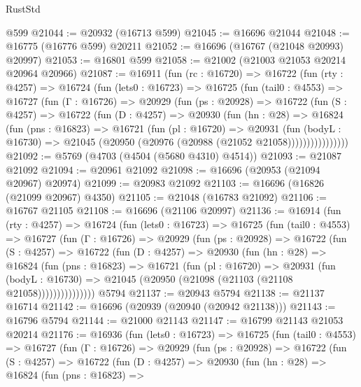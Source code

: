 \begin{lexlean}{RustStd}
\begin{coremodule}
    @599
@21044 := @20932 (@16713 @599)
@21045 := @16696 @21044
@21048 := @16775 (@16776 @599) @20211
@21052 := @16696 (@16767 (@21048 @20993) @20997)
@21053 := @16801 @599
@21058 := @21002 (@21003 @21053 @20214 @20964 @20966)
@21087 := @16911
    (fun (rc : @16720) =>
    @16722
      (fun (rty : @4257) =>
      @16724
        (fun (lets0 : @16723) =>
        @16725
          (fun (tail0 : @4553) =>
          @16727
            (fun (Γ : @16726) =>
            @20929
              (fun (ps : @20928) =>
              @16722
                (fun (S : @4257) =>
                @16722
                  (fun (D : @4257) =>
                  @20930
                    (fun (hn : @28) =>
                    @16824
                      (fun (pns : @16823) =>
                      @16721
                        (fun (pl : @16720) =>
                        @20931
                          (fun (bodyL : @16730) =>
                          @21045 (@20950 (@20976 (@20988 (@21052 @21058))))))))))))))))
@21092 := @5769 (@4703 (@4504 (@5680 @4310) @4514))
@21093 := @21087 @21092
@21094 := @20961 @21092
@21098 := @16696 (@20953 (@21094 @20967) @20974)
@21099 := @20983 @21092
@21103 := @16696 (@16826 (@21099 @20967) @4350)
@21105 := @21048 (@16783 @21092)
@21106 := @16767 @21105
@21108 := @16696 (@21106 @20997)
@21136 := @16914
    (fun (rty : @4257) =>
    @16724
      (fun (lets0 : @16723) =>
      @16725
        (fun (tail0 : @4553) =>
        @16727
          (fun (Γ : @16726) =>
          @20929
            (fun (ps : @20928) =>
            @16722
              (fun (S : @4257) =>
              @16722
                (fun (D : @4257) =>
                @20930
                  (fun (hn : @28) =>
                  @16824
                    (fun (pns : @16823) =>
                    @16721
                      (fun (pl : @16720) =>
                      @20931
                        (fun (bodyL : @16730) =>
                        @21045 (@20950 (@21098 (@21103 (@21108 @21058)))))))))))))))
    @5794
@21137 := @20943 @5794
@21138 := @21137 @16714
@21142 := @16696 (@20939 (@20940 (@20942 @21138)))
@21143 := @16796 @5794
@21144 := @21000 @21143
@21147 := @16799 @21143 @21053 @20214
@21176 := @16936
    (fun (lets0 : @16723) =>
    @16725
      (fun (tail0 : @4553) =>
      @16727
        (fun (Γ : @16726) =>
        @20929
          (fun (ps : @20928) =>
          @16722
            (fun (S : @4257) =>
            @16722
              (fun (D : @4257) =>
              @20930
                (fun (hn : @28) =>
                @16824
                  (fun (pns : @16823) =>

\end{coremodule}
\end{lexlean}
